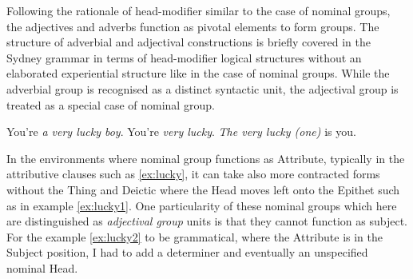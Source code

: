 	Following the rationale of head-modifier similar to the case of nominal groups, the adjectives and adverbs function as pivotal elements to form groups. The structure of adverbial and adjectival constructions is briefly covered in the Sydney grammar in terms of head-modifier logical structures without an elaborated experiential structure like in the case of nominal groups. While the adverbial group is recognised as a distinct syntactic unit, the adjectival group is treated as a special case of nominal group. %
	
	\begin{exe}
		\ex\label{ex:lucky} You're \textit{a very lucky boy}.
        \ex\label{ex:lucky1} You're \textit{very lucky}.
        \ex\label{ex:lucky2} \textit{The very lucky (one)} is you.
	\end{exe}
	
    

    In the environments where nominal group functions as Attribute, typically in the attributive clauses such as \ref{ex:lucky}, it can take also more contracted forms without the Thing and Deictic where the Head moves left onto the Epithet such as in example \ref{ex:lucky1}. One particularity of these nominal groups which here are distinguished as \textit{adjectival group} units is that they cannot function as subject. For the example \ref{ex:lucky2} to be grammatical, where the Attribute is in the Subject position, I had to add a determiner and eventually an unspecified nominal Head. 

    
    
	
